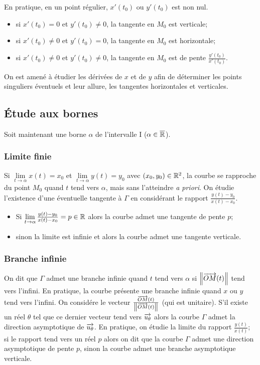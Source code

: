 En pratique, en un point régulier, $x'(t_0)$ ou $y'(t_0)$ est non nul.
\begin{itemize}
\item si $x'(t_0)=0$ et $y'(t_0) \neq 0$, la tangente en $M_0$ est verticale;
\item si $x'(t_0) \neq 0$ et $y'(t_0) = 0$, la tangente en $M_0$ est horizontale;
\item si $x'(t_0) \neq 0$ et $y'(t_0) \neq 0$, la tangente en $M_0$ est de pente $\frac{y'(t_0)}{x'(t_0)}$.
\end{itemize}
On est amené à étudier les dérivées de $x$ et de $y$ afin de déterminer les points singuliers éventuels et leur allure, les tangentes horizontales et verticales.

\subsection{Étude aux bornes}
Soit maintenant une borne $\alpha$ de l'intervalle I ($\alpha \in \overline{\mathbb{R}}$).

\subsubsection{Limite finie}
Si $\lim\limits_{t \to \alpha}{x(t)}=x_0$ et $\lim\limits_{t \to \alpha}{y(t)}=y_0$ avec $(x_0,y_0) \in \mathbb{R}^2$, la courbe se rapproche du point $M_0$ quand $t$ tend vers $\alpha$, mais sans l'atteindre \emph{a priori}. On étudie l'existence d'une éventuelle tangente à $\Gamma$ en considérant le rapport $\frac{y(t)-y_0}{x(t)-x_0}$.
\begin{itemize}
\item Si $\lim\limits_{t \to \alpha}\frac{y(t)-y_0}{x(t)-x_0}=p \in \mathbb{R}$ alors la courbe admet une tangente de pente $p$;
\item sinon la limite est infinie et alors la courbe admet une tangente verticale.
\end{itemize}

\subsubsection{Branche infinie}
On dit que $\Gamma$ admet une branche infinie quand $t$ tend vers $\alpha$ si $\left\lVert\overrightarrow{OM}(t)\right\rVert$ tend vers l'infini. En pratique, la courbe présente une branche infinie quand $x$ ou $y$ tend vers l'infini. On considére le vecteur $\frac{\overrightarrow{OM}(t)}{\left\lVert\overrightarrow{OM}(t)\right\rVert}$ (qui est unitaire). S'il existe un réel $\theta$ tel que ce dernier vecteur tend vers $\overrightarrow{u_\theta}$ alors la courbe $\Gamma$ admet la direction asymptotique de $\overrightarrow{u_\theta}$. En pratique, on étudie la limite du rapport $\frac{y(t)}{x(t)}$; si le rapport tend vers un réel $p$ alors on dit que la courbe $\Gamma$ admet une direction asymptotique de pente $p$, sinon la courbe admet une branche asymptotique verticale.

